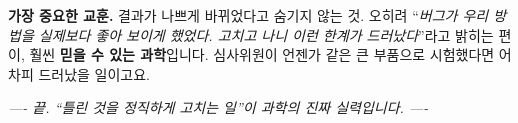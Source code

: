 \documentclass[11pt,a4paper]{article}
\begin{document}
\begin{warnbox}
\textbf{가장 중요한 교훈.} 결과가 나쁘게 바뀌었다고 숨기지 않는 것. 오히려
``\emph{버그가 우리 방법을 실제보다 좋아 보이게 했었다. 고치고 나니 이런 한계가
드러났다}''라고 밝히는 편이, 훨씬 \textbf{믿을 수 있는 과학}입니다. 심사위원이
언젠가 같은 큰 부품으로 시험했다면 어차피 드러났을 일이고요.
\end{warnbox}

\bigskip
\begin{center}
\emph{---- 끝. ``틀린 것을 정직하게 고치는 일''이 과학의 진짜 실력입니다. ----}
\end{center}
\end{document}
